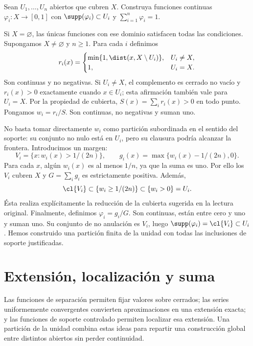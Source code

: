 \begin{ejercicio}
Sean $U_1,\ldots,U_n$ abiertos que cubren $X$. Construya funciones continuas $\varphi_i:X\to[0,1]$ con $\supp(\varphi_i)\subset U_i$ y $\sum_{i=1}^n\varphi_i=1$.
\end{ejercicio}
\begin{solucion}
Si $X=\varnothing$, las únicas funciones con ese dominio satisfacen todas las condiciones. Supongamos $X\ne\varnothing$ y $n\geq1$. Para cada $i$ definimos
\[
 r_i(x)=\begin{cases}
 \min\{1,\dist(x,X\setminus U_i)\},&U_i\ne X,\\
 1,&U_i=X.
 \end{cases}
\]
Son continuas y no negativas. Si $U_i\ne X$, el complemento es cerrado no vacío y $r_i(x)>0$ exactamente cuando $x\in U_i$; esta afirmación también vale para $U_i=X$. Por la propiedad de cubierta, $S(x)=\sum_i r_i(x)>0$ en todo punto. Pongamos $w_i=r_i/S$. Son continuas, no negativas y suman uno.

No basta tomar directamente $w_i$ como partición subordinada en el sentido del soporte: su conjunto no nulo está en $U_i$, pero su clausura podría alcanzar la frontera. Introducimos un margen:
\[
 V_i=\{x:w_i(x)>1/(2n)\},\qquad
 g_i(x)=\max\{w_i(x)-1/(2n),0\}.
\]
Para cada $x$, algún $w_i(x)$ es al menos $1/n$, ya que la suma es uno. Por ello los $V_i$ cubren $X$ y $G=\sum_i g_i$ es estrictamente positiva. Además,
\[
 \cl{V_i}\subset\{w_i\geq1/(2n)\}\subset\{w_i>0\}=U_i.
\]
Ésta realiza explícitamente la reducción de la cubierta sugerida en la lectura original. Finalmente, definimos $\varphi_i=g_i/G$. Son continuas, están entre cero y uno y suman uno. Su conjunto de no anulación es $V_i$, luego $\supp(\varphi_i)=\cl{V_i}\subset U_i$. Hemos construido una partición finita de la unidad con todas las inclusiones de soporte justificadas.
\end{solucion}

\section{Extensión, localización y suma}
Las funciones de separación permiten fijar valores sobre cerrados; las series uniformemente convergentes convierten aproximaciones en una extensión exacta; y las funciones de soporte controlado permiten localizar esa extensión. Una partición de la unidad combina estas ideas para repartir una construcción global entre distintos abiertos sin perder continuidad.
